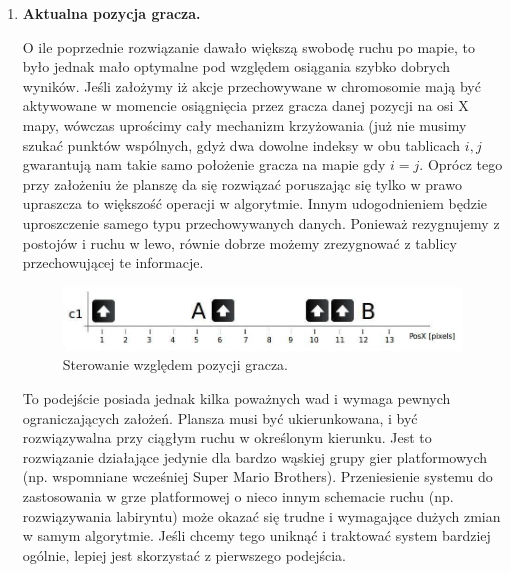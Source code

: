 \begin{par}
\begin{enumerate}
\begin{par}
	\end{par}
	\item
	{\bf Aktualna pozycja gracza.}
	\begin{par}
		O ile poprzednie rozwiązanie dawało większą swobodę ruchu po mapie, to było jednak mało optymalne pod względem osiągania szybko dobrych wyników.
		Jeśli założymy iż akcje przechowywane w chromosomie mają być aktywowane w momencie osiągnięcia przez gracza danej pozycji na osi X mapy, wówczas uprościmy cały mechanizm krzyżowania (już nie musimy szukać punktów wspólnych, gdyż dwa dowolne indeksy w obu tablicach $i,j$ gwarantują nam takie samo położenie gracza na mapie gdy $i=j$.
		Oprócz tego przy założeniu że planszę da się rozwiązać poruszając się tylko w prawo upraszcza to większość operacji w algorytmie.
		Innym udogodnieniem będzie uproszczenie samego typu przechowywanych danych. Ponieważ rezygnujemy z postojów i ruchu w lewo, równie dobrze możemy zrezygnować z tablicy przechowującej te informacje.

		\begin{par}
		\begin{figure}[!h]
		\centering
		\includegraphics[width=\textwidth]{obrazki/sterowanie2.jpg}
		\caption{Sterowanie względem pozycji gracza.}
		\label{fig:sterowanie2}
		\end{figure}
		\end{par}

		To podejście posiada jednak kilka poważnych wad i wymaga pewnych ograniczających założeń.
		Plansza musi być ukierunkowana, i być rozwiązywalna przy ciągłym ruchu w określonym kierunku.
		Jest to rozwiązanie działające jedynie dla bardzo wąskiej grupy gier platformowych (np. wspomniane wcześniej Super Mario Brothers).
		Przeniesienie systemu do zastosowania w grze platformowej o nieco innym schemacie ruchu (np. rozwiązywania labiryntu) może okazać się trudne i wymagające dużych zmian w samym algorytmie.
		Jeśli chcemy tego uniknąć i traktować system bardziej ogólnie, lepiej jest skorzystać z pierwszego podejścia.
	\end{par}
	\end{enumerate}
	\FloatBarrier
\end{par}

